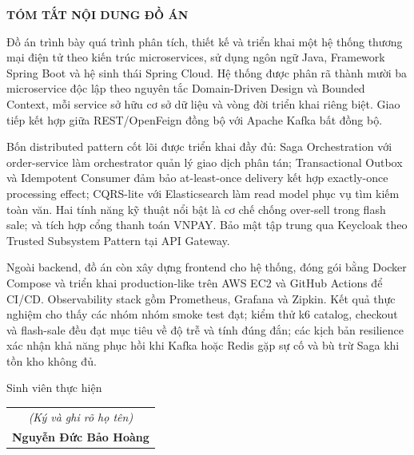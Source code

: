 \documentclass[../DoAn.tex]{subfiles}
\begin{document}
\begin{center}
    \Large{\textbf{TÓM TẮT NỘI DUNG ĐỒ ÁN}}\\
\end{center}
\vspace{1cm}

Đồ án trình bày quá trình phân tích, thiết kế và triển khai một hệ thống thương mại điện tử
theo kiến trúc microservices, sử dụng ngôn ngữ Java, Framework Spring Boot và hệ sinh thái Spring Cloud. Hệ thống được phân rã thành mười ba microservice độc lập theo nguyên tắc Domain-Driven Design và Bounded Context, mỗi service sở hữu cơ sở dữ liệu và vòng đời triển khai riêng biệt. Giao tiếp kết hợp giữa REST/OpenFeign đồng bộ với Apache Kafka bất đồng bộ.

Bốn distributed pattern cốt lõi được triển khai đầy đủ: Saga Orchestration với order-service
làm orchestrator quản lý giao dịch phân tán; Transactional Outbox và Idempotent Consumer đảm
bảo at-least-once delivery kết hợp exactly-once processing effect; CQRS-lite với Elasticsearch
làm read model phục vụ tìm kiếm toàn văn. Hai tính năng kỹ thuật nổi bật là cơ chế chống
over-sell trong flash sale; và tích hợp cổng thanh toán VNPAY. Bảo mật tập trung qua Keycloak  theo Trusted Subsystem Pattern tại API Gateway.

Ngoài backend, đồ án còn xây dựng frontend cho hệ thống, đóng gói bằng Docker Compose
và triển khai production-like trên AWS EC2 và GitHub Actions để CI/CD. Observability stack gồm Prometheus, Grafana và Zipkin. Kết quả thực nghiệm cho thấy các nhóm nhóm smoke test đạt; kiểm thử k6 catalog, checkout và flash-sale đều đạt mục tiêu về độ trễ và tính đúng đắn; các kịch bản resilience xác nhận khả năng phục hồi khi Kafka hoặc Redis gặp sự cố và bù trừ Saga khi tồn kho không đủ.

\vspace{1cm}

\begin{flushright}
Sinh viên thực hiện\\
\begin{tabular}{@{}c@{}}
\textit{(Ký và ghi rõ họ tên)}\\
\textbf{Nguyễn Đức Bảo Hoàng}
\end{tabular}
\end{flushright}
\end{document}
